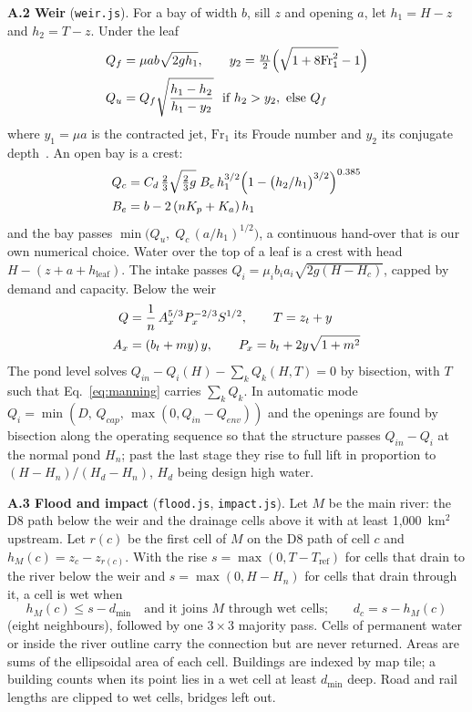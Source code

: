 \documentclass[10pt,a4paper,twocolumn]{extarticle}
\newcommand{\kmsq}{km$^2$}
\begin{document}
\textbf{A.2 Weir} (\texttt{weir.js}). For a bay of width $b$, sill $z$ and opening $a$, let $h_1=H-z$ and
$h_2=T-z$. Under the leaf
\begin{align}
Q_f &= \mu ab\sqrt{2gh_1},\qquad y_2=\tfrac{y_1}{2}\Big(\sqrt{1+8\mathrm{Fr}_1^2}-1\Big) \label{eq:gate}\\
Q_u &= Q_f\sqrt{\frac{h_1-h_2}{h_1-y_2}}\ \ \text{if } h_2>y_2,\ \text{else } Q_f \notag
\end{align}
where $y_1=\mu a$ is the contracted jet, $\mathrm{Fr}_1$ its Froude number and $y_2$ its conjugate
depth~\citep{henderson1966}. An open bay is a crest:
\begin{align}
Q_c &= C_d\,\tfrac23\sqrt{\tfrac23g}\;B_e\,h_1^{3/2}\Big(1-\big(h_2/h_1\big)^{3/2}\Big)^{0.385} \label{eq:crest}\\
B_e &= b-2\,(nK_p+K_a)\,h_1 \notag
\end{align}
and the bay passes $\min\!\big(Q_u,\;Q_c\,(a/h_1)^{1/2}\big)$, a continuous hand-over that is our own numerical
choice. Water over the top of a leaf is a crest with head $H-(z+a+h_{\mathrm{leaf}})$. The intake passes
$Q_i=\mu_ib_ia_i\sqrt{2g(H-H_c)}$, capped by demand and capacity. Below the weir~\citep{chow1959}
\begin{align}
Q &= \frac1n\,A_x^{5/3}P_x^{-2/3}S^{1/2},\qquad T=z_t+y \label{eq:manning}\\
A_x &= (b_t+m y)\,y,\qquad P_x=b_t+2y\sqrt{1+m^2} \notag
\end{align}
The pond level solves $Q_{in}-Q_i(H)-\sum_k Q_k(H,T)=0$ by bisection, with $T$ such that Eq.~\ref{eq:manning}
carries $\sum_kQ_k$. In automatic mode $Q_i=\min(D,\,Q_{cap},\,\max(0,Q_{in}-Q_{env}))$ and the openings are found
by bisection along the operating sequence so that the structure passes $Q_{in}-Q_i$ at the normal pond $H_n$; past
the last stage they rise to full lift in proportion to $(H-H_n)/(H_d-H_n)$, $H_d$ being design high water.

\textbf{A.3 Flood and impact} (\texttt{flood.js}, \texttt{impact.js}). Let $M$ be the main river: the D8 path below
the weir and the drainage cells above it with at least 1,000~\kmsq{} upstream. Let $r(c)$ be the first cell of $M$
on the D8 path of cell $c$ and $h_M(c)=z_c-z_{r(c)}$. With the rise $s=\max(0,T-T_{\mathrm{ref}})$ for cells that
drain to the river below the weir and $s=\max(0,H-H_n)$ for cells that drain through it, a cell is wet when
\begin{equation}
h_M(c)\le s-d_{\min}\quad\text{and it joins } M \text{ through wet cells;}\qquad d_c=s-h_M(c) \label{eq:flood}
\end{equation}
(eight neighbours), followed by one $3\times3$ majority pass. Cells of permanent water or inside the river outline
carry the connection but are never returned. Areas are sums of the ellipsoidal area of each cell. Buildings are
indexed by map tile; a building counts when its point lies in a wet cell at least $d_{\min}$ deep. Road and rail
lengths are clipped to wet cells, bridges left out.
\end{document}

